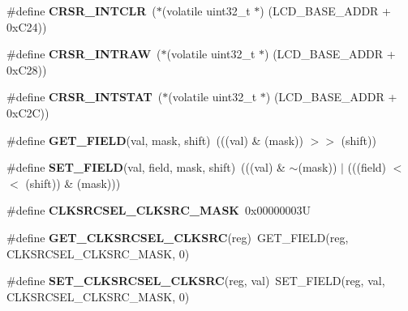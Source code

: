 \begin{DoxyCompactItemize}
\#define {\bfseries C\+R\+S\+R\+\_\+\+I\+N\+T\+C\+LR}~($\ast$(volatile uint32\+\_\+t $\ast$) (L\+C\+D\+\_\+\+B\+A\+S\+E\+\_\+\+A\+D\+DR + 0x\+C24))
\item 
\mbox{\label{group__lpc24xx__regs_ga64be6960ad66683ef12265cbcfa91e5c}} 
\#define {\bfseries C\+R\+S\+R\+\_\+\+I\+N\+T\+R\+AW}~($\ast$(volatile uint32\+\_\+t $\ast$) (L\+C\+D\+\_\+\+B\+A\+S\+E\+\_\+\+A\+D\+DR + 0x\+C28))
\item 
\mbox{\label{group__lpc24xx__regs_ga46d3f1a7eacec2232824d78c471f3e7b}} 
\#define {\bfseries C\+R\+S\+R\+\_\+\+I\+N\+T\+S\+T\+AT}~($\ast$(volatile uint32\+\_\+t $\ast$) (L\+C\+D\+\_\+\+B\+A\+S\+E\+\_\+\+A\+D\+DR + 0x\+C2\+C))
\item 
\mbox{\label{group__lpc24xx__regs_gab1ba6120cd0fd753c62ac9b54778c2f1}} 
\#define {\bfseries G\+E\+T\+\_\+\+F\+I\+E\+LD}(val,  mask,  shift)~(((val) \& (mask)) $>$$>$ (shift))
\item 
\mbox{\label{group__lpc24xx__regs_ga933379115682352d7e7c11b0c00e3248}} 
\#define {\bfseries S\+E\+T\+\_\+\+F\+I\+E\+LD}(val,  field,  mask,  shift)~(((val) \& $\sim$(mask)) $\vert$ (((field) $<$$<$ (shift)) \& (mask)))
\item 
\mbox{\label{group__lpc24xx__regs_ga8aecd2cbcb5a19b4b9c237383ad0d2da}} 
\#define {\bfseries C\+L\+K\+S\+R\+C\+S\+E\+L\+\_\+\+C\+L\+K\+S\+R\+C\+\_\+\+M\+A\+SK}~0x00000003U
\item 
\mbox{\label{group__lpc24xx__regs_ga03ff10c9a9338d252aacef5cc1613e22}} 
\#define {\bfseries G\+E\+T\+\_\+\+C\+L\+K\+S\+R\+C\+S\+E\+L\+\_\+\+C\+L\+K\+S\+RC}(reg)~G\+E\+T\+\_\+\+F\+I\+E\+LD(reg, C\+L\+K\+S\+R\+C\+S\+E\+L\+\_\+\+C\+L\+K\+S\+R\+C\+\_\+\+M\+A\+SK, 0)
\item 
\mbox{\label{group__lpc24xx__regs_gac12b98de9fe0996e24f6c0821e293245}} 
\#define {\bfseries S\+E\+T\+\_\+\+C\+L\+K\+S\+R\+C\+S\+E\+L\+\_\+\+C\+L\+K\+S\+RC}(reg,  val)~S\+E\+T\+\_\+\+F\+I\+E\+LD(reg, val, C\+L\+K\+S\+R\+C\+S\+E\+L\+\_\+\+C\+L\+K\+S\+R\+C\+\_\+\+M\+A\+SK, 0)
\item 
\mbox{\label{group__lpc24xx__regs_gafdbb6ac3783433be56d14f1a4c49fc7c}} 

\end{DoxyCompactItemize}

